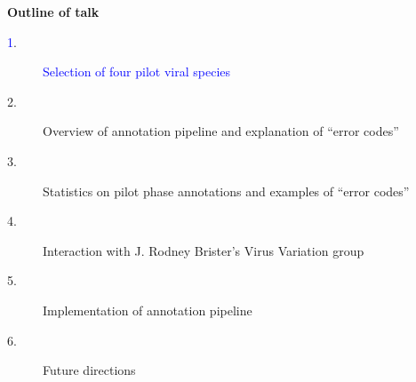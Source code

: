 \documentclass[landscape]{slides}
\begin{document}
\begin{slide}
\begin{center}
\textbf{Outline of talk}

\small
\begin{description}
\item[\textcolor{blue}1.] \textcolor{blue}{Selection of four pilot viral species}
\item[2.] Overview of annotation pipeline and explanation of ``error codes''
\item[3.] Statistics on pilot phase annotations and examples of ``error codes''
\item[4.] Interaction with J. Rodney Brister's Virus Variation group
\item[5.] Implementation of annotation pipeline
\item[6.] Future directions
\end{description}

\end{center}
\vfill
\end{slide}
\end{document}
